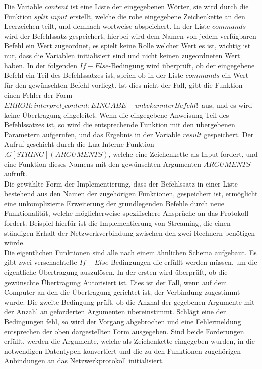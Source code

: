 Die Variable $content$ ist eine Liste der eingegebenen Wörter, sie wird durch die Funktion $split\_input$ erstellt, welche die rohe eingegebene Zeichenkette an den Leerzeichen teilt, und demnach wortweise abspeichert. In der Liste $commands$ wird der Befehlssatz gespeichert, hierbei wird dem Namen von jedem verfügbaren Befehl ein Wert zugeordnet, es spielt keine Rolle welcher Wert es ist, wichtig ist nur, dass die Variablen initialisiert sind und nicht keinen zugeordneten Wert haben. In der folgenden $If-Else$-Bedingung wird überprüft, ob der eingegebene Befehl ein Teil des Befehlssatzes ist, sprich ob in der Liste $commands$ ein Wert für den gewünschten Befehl vorliegt. Ist dies nicht der Fall, gibt die Funktion einen Fehler der Form \glqq$ERROR: interpret\_content: EINGABE - unbekannter Befehl!$\grqq\ aus, und es wird keine Übertragung eingeleitet. Wenn die eingegebene Anweisung Teil des Befehlssatzes ist, so wird die entsprechende Funktion mit den übergebenen Parametern aufgerufen, und das Ergebnis in der Variable $result$ gespeichert. Der Aufruf geschieht durch die Lua-Interne Funktion $.G[STRING](ARGUMENTS)$, welche eine Zeichenkette als Input fordert, und eine Funktion dieses Namens mit den gewünschten Argumenten $ARGUMENTS$ aufruft.\\ Die gewählte Form der Implementierung, dass der Befehlssatz in einer Liste bestehend aus den Namen der zugehörigen Funktionen, gespeichert ist, ermöglicht eine unkomplizierte Erweiterung der grundlegenden Befehle durch neue Funktionalität, welche möglicherweise spezifischere Ansprüche an das Protokoll fordert. Beispiel hierfür ist die Implementierung von Streaming, die einen ständigen Erhalt der Netzwerkverbindung zwischen den zwei Rechnern benötigen würde. \\
Die eigentlichen Funktionen sind alle nach einem ähnlichen Schema aufgebaut. Es gibt zwei verschachtelte $If-Else$-Bedingungen die erfüllt werden müssen, um die eigentliche Übertragung auszulösen. In der ersten wird überprüft, ob die gewünschte Übertragung Autorisiert ist. Dies ist der Fall, wenn auf dem Computer an den die Übertragung gerichtet ist, der Verbindung zugestimmt wurde. Die zweite Bedingung prüft, ob die Anzhal der gegebenen Argumente mit der Anzahl an geforderten Argumenten übereinstimmt. Schlägt eine der Bedingungen fehl, so wird der Vorgang abgebrochen und eine Fehlermeldung entsprechen der oben dargestellten Form ausgegeben. Sind beide Forderungen erfüllt, werden die Argumente, welche als Zeichenkette eingegeben wurden, in die notwendigen Datentypen konvertiert und die zu den Funktionen zugehörigen Anbindungen an das Netzwerkprotokoll initialisiert.  \\\hfill\\
